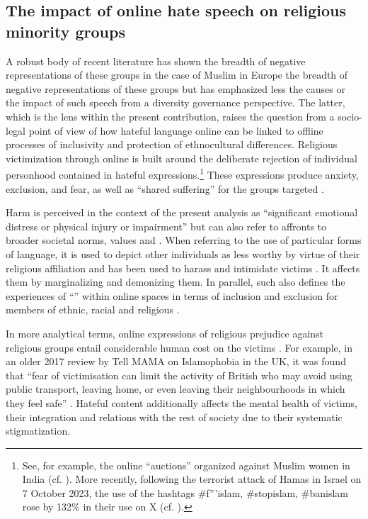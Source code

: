 \documentclass[output=paper,colorlinks,citecolor=brown]{langscibook}
\begin{document}
\subsection{The impact of online hate speech on religious minority groups}\label{ch.1.2.ss.2.2}

A robust body of recent literature has shown the breadth of negative representations of these groups in the case of Muslim  in Europe \citep{awan2016,evolvi2018,evolvi2019,koo2018,moe2019,benigni_joseph_carley2017} the breadth of negative representations of these groups but has emphasized less the causes or the impact of such speech from a diversity governance perspective. The latter, which is the lens within the present contribution, raises the question from a socio-legal point of view of how hateful language online can be linked to offline processes of inclusivity and protection of ethnocultural differences. Religious victimization through online  is built around the deliberate rejection of individual personhood contained in hateful expressions.\footnote{%
See, for example, the online ``auctions'' organized against Muslim women in India (cf. \citealt{nabi2022}). More recently, following the terrorist attack of Hamas in Israel on 7 October 2023, the use of the hashtags \#f'''islam, \#stopislam, \#banislam rose by 132\% in their use on X (cf. \citealt{rose_davey2023}).} These expressions produce anxiety, exclusion, and fear, as well as ``shared suffering'' for the groups targeted \citep[143]{walters_paterson_mcdonnell_brown2020}.

Harm is perceived in the context of the present analysis as ``significant emotional distress or physical injury or impairment'' but can also refer to affronts to broader societal norms, values and  \citep[201]{powell_scott_henry2020}. When referring to the use of particular forms of language, it is used to depict other individuals as less worthy by virtue of their religious affiliation and has been used to harass and intimidate victims \citep[2]{awan2016}. It affects them by marginalizing and demonizing them. In parallel, such  also defines the experiences of ``'' within online spaces in terms of inclusion and exclusion for members of ethnic, racial and religious  \citep{antonsich2010,yuval-davis2006}.

In more analytical terms, online expressions of religious prejudice against religious  groups entail considerable human cost on the victims \citep[2]{vidgen_yasseri_margetts2021}. For example, in an older 2017 review by Tell MAMA on Islamophobia in the UK, it was found that ``fear of victimisation can limit the activity of British  who may avoid using public transport, leaving home, or even leaving their neighbourhoods in which they feel safe'' \citep[11]{tell_mama2017}. Hateful content additionally affects the mental health of victims, their integration and relations with the rest of society due to their systematic stigmatization. 
\end{document}
